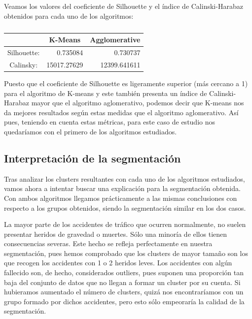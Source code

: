 \documentclass[a4paper,11pt]{book}
\begin{document}
Veamos los valores del coeficiente de Silhouette y el índice de Calinski-Harabaz obtenidos para cada uno de los algoritmos:
\begin{table}[htbp]
	\begin{center}	
	\caption{}
	\begin{tabular}{|c|r|r|}
		\hline
		\textbf{} & \multicolumn{1}{c|}{\textbf{K-Means}} & \multicolumn{1}{c|}{\textbf{Agglomerative}} \\ \hline
		Silhouette:  & 0.735084 & 0.730737 \\ \hline
		Calinsky:  & 15017.27629 & 12399.641611 \\ \hline
	\end{tabular}\end{center}
	\label{}
\end{table}

Puesto que el coeficiente de Silhouette es ligeramente superior (más cercano a 1) para el algoritmo de K-means y este también presenta un índice de Calinski-Harabaz mayor que el algoritmo aglomerativo, podemos decir que K-means nos da mejores resultados según estas medidas que el algoritmo aglomerativo. Así pues, teniendo en cuenta estas métricas, para este caso de estudio nos quedaríamos con el primero de los algoritmos estudiados. 



\newpage
\subsection{Interpretación de la segmentación}

Tras analizar los clusters resultantes con cada uno de los algoritmos estudiados, vamos ahora a intentar buscar una explicación para la segmentación obtenida. Con ambos algoritmos llegamos prácticamente a las mismas conclusiones con respecto a los grupos obtenidos, siendo la segmentación similar en los dos casos. 

La mayor parte de los accidentes de tráfico que ocurren normalmente, no suelen presentar heridos de gravedad o muertes. Sólo una minoría de ellos tienen consecuencias severas. Este hecho se refleja perfectamente en nuestra segmentación, pues hemos comprobado que los clusters de mayor tamaño son los que recogen los accidentes con 1 o 2 heridos leves. Los accidentes con algún fallecido son, de hecho, considerados outliers, pues suponen una proporción tan baja del conjunto de datos que no llegan a formar un cluster por su cuenta. Si hubieramos aumentado el número de clusters, quizá nos encontraríamos con un grupo formado por dichos accidentes, pero esto sólo empeoraría la calidad de la segmentación. 
\end{document}
